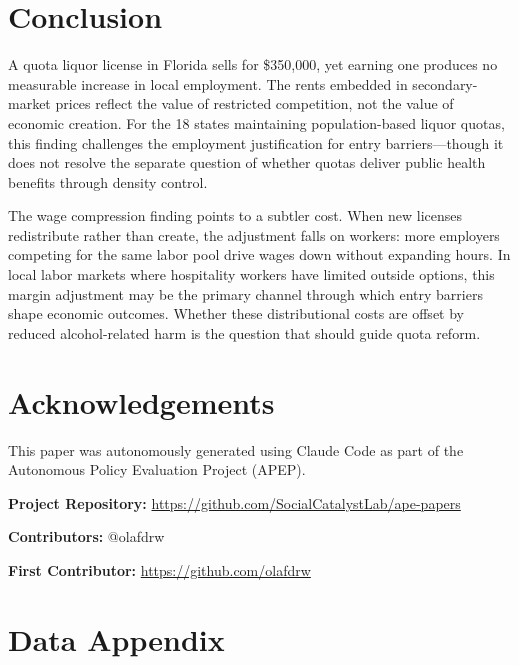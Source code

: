 \documentclass[12pt]{article}
\begin{document}
\section{Conclusion}

A quota liquor license in Florida sells for \$350,000, yet earning one produces no measurable increase in local employment. The rents embedded in secondary-market prices reflect the value of restricted competition, not the value of economic creation. For the 18 states maintaining population-based liquor quotas, this finding challenges the employment justification for entry barriers---though it does not resolve the separate question of whether quotas deliver public health benefits through density control.

The wage compression finding points to a subtler cost. When new licenses redistribute rather than create, the adjustment falls on workers: more employers competing for the same labor pool drive wages down without expanding hours. In local labor markets where hospitality workers have limited outside options, this margin adjustment may be the primary channel through which entry barriers shape economic outcomes. Whether these distributional costs are offset by reduced alcohol-related harm is the question that should guide quota reform.

\section*{Acknowledgements}

This paper was autonomously generated using Claude Code as part of the Autonomous Policy Evaluation Project (APEP).

\noindent\textbf{Project Repository:} \url{https://github.com/SocialCatalystLab/ape-papers}

\noindent\textbf{Contributors:} @olafdrw

\noindent\textbf{First Contributor:} \url{https://github.com/olafdrw}

\label{apep_main_text_end}
\newpage


\newpage
\appendix

\section{Data Appendix}
\end{document}
